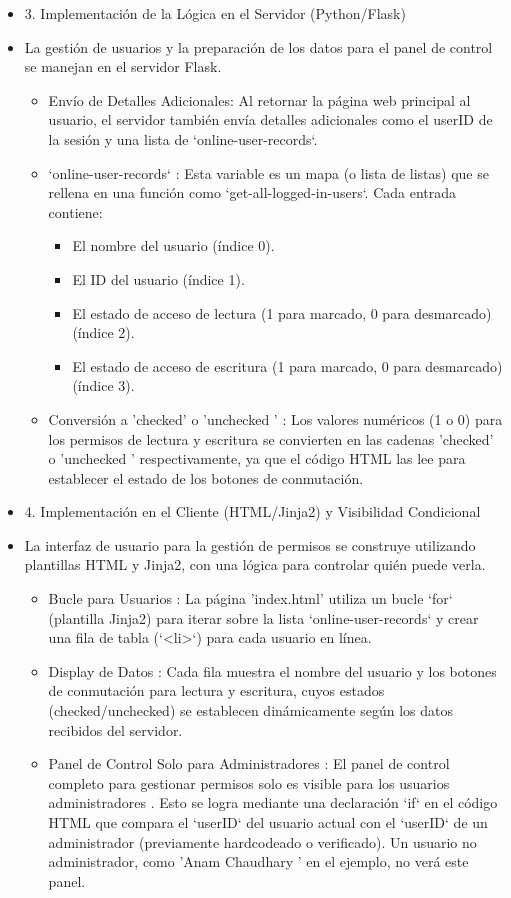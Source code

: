 \documentclass{report}
\begin{document}
\begin{itemize}
    \item 3. Implementación de la Lógica en el Servidor (Python/Flask)
    \item La gestión de usuarios y la preparación de los datos para el panel de control se manejan en el servidor Flask.
    \begin{itemize}
        \item Envío de Detalles Adicionales: Al retornar la página web principal al usuario, el servidor también envía detalles adicionales como el 
        userID de la sesión y una lista de `online-user-records`.
        \item `online-user-records` : Esta variable es un mapa (o lista de listas) que se rellena en una función como `get-all-logged-in-users`. 
        Cada entrada contiene:
        \begin{itemize}
            \item El  nombre del usuario  (índice 0).
            \item El  ID del usuario  (índice 1).
            \item El  estado de acceso de lectura  (1 para marcado, 0 para desmarcado) (índice 2).
            \item El  estado de acceso de escritura  (1 para marcado, 0 para desmarcado) (índice 3).
        \end{itemize}
        \item Conversión a 'checked' o  'unchecked ' : Los valores numéricos (1 o 0) para los permisos de lectura y escritura se convierten en las 
        cadenas 'checked' o  'unchecked ' respectivamente, ya que el código HTML las lee para establecer el estado de los botones de conmutación.
    \end{itemize}

    \item 4. Implementación en el Cliente (HTML/Jinja2) y Visibilidad Condicional
    \item La interfaz de usuario para la gestión de permisos se construye utilizando plantillas HTML y Jinja2, con una lógica para controlar quién puede verla.
    \begin{itemize}
        \item Bucle para Usuarios : La página 'index.html' utiliza un bucle `for` (plantilla Jinja2) para iterar sobre la lista `online-user-records` 
        y crear una fila de tabla (`<li>`) para cada usuario en línea.
        \item Display de Datos : Cada fila muestra el nombre del usuario y los botones de conmutación para lectura y escritura, cuyos estados 
        (checked/unchecked) se establecen dinámicamente según los datos recibidos del servidor.
        \item Panel de Control Solo para Administradores : El  panel de control completo para gestionar permisos solo es visible para los usuarios 
        administradores . Esto se logra mediante una declaración `if` en el código HTML que compara el `userID` del usuario actual con el `userID` 
        de un administrador (previamente hardcodeado o verificado). Un usuario no administrador, como  'Anam Chaudhary ' en el ejemplo, no verá este panel.
    \end{itemize}


\end{itemize}
\end{document}
